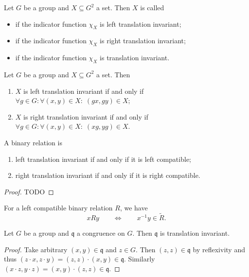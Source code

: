 \begin{definition}
Let $G$ be a group and $X\subseteq G^2$ a set. Then $X$ is called
\begin{itemize}
\item {} if the indicator function $\chi_X$ is left translation invariant;
\item {} if the indicator function $\chi_X$ is right translation invariant;
\item {} if the indicator function $\chi_X$ is translation invariant.
\end{itemize}
\end{definition}

\begin{lemma}
Let $G$ be a group and $X\subseteq G^2$ a set. Then
\begin{enumerate}
\item $X$ is left translation invariant \textup{if and only if} $\forall g\in G: \forall (x,y)\in X: \; (gx, gy)\in X$;
\item $X$ is right translation invariant \textup{if and only if} $\forall g\in G: \forall (x,y)\in X: \; (xg, yg)\in X$.
\end{enumerate}
\end{lemma}

\begin{lemma}
A binary relation is
\begin{enumerate}
\item left translation invariant \textup{if and only if} it is left compatible;
\item right translation invariant \textup{if and only if} it is right compatible.
\end{enumerate}
\end{lemma}
\begin{proof}
TODO
\end{proof}

For a left compatible binary relation $R$, we have
\[ xRy \qquad\iff\qquad x^{-1}y \in \widetilde{R}. \]

\begin{proposition} \label{congruenceTranslationInvariant}
Let $G$ be a group and $\mathfrak{q}$ a congruence on $G$. Then $\mathfrak{q}$ is translation invariant. 
\end{proposition}
\begin{proof}
Take arbitrary $(x,y)\in\mathfrak{q}$ and $z\in G$. Then $(z,z)\in\mathfrak{q}$ by reflexivity and thus $(z\cdot x, z\cdot y) = (z,z)\cdot (x,y)\in\mathfrak{q}$. Similarly $(x\cdot z, y\cdot z) = (x,y)\cdot (z,z)\in\mathfrak{q}$.
\end{proof}

